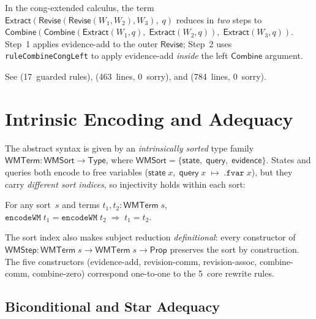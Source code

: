 \documentclass[11pt,openany]{report}
\begin{document}
\begin{theorem}
In the cong-extended calculus, the term
$\mathsf{Extract}(\mathsf{Revise}(\mathsf{Revise}(W_1, W_2), W_3),\; q)$
reduces in \emph{two} steps to
$\mathsf{Combine}(\mathsf{Combine}(\mathsf{Extract}(W_1,q),\;
\mathsf{Extract}(W_2,q)),\; \mathsf{Extract}(W_3,q))$.
Step~1 applies evidence-add to the outer $\mathsf{Revise}$;
Step~2 uses \texttt{ruleCombineCongLeft} to apply evidence-add
\emph{inside} the left $\mathsf{Combine}$ argument.
\end{theorem}

\noindent
See 
(17~guarded rules),
(463~lines, 0~sorry), and
(784~lines, 0~sorry).

\section{Intrinsic Encoding and Adequacy}
\label{sec:wm-encoding}

The abstract syntax is given by an \emph{intrinsically sorted} type family
$\mathsf{WMTerm} : \mathsf{WMSort} \to \mathsf{Type}$, where
$\mathsf{WMSort} = \{\mathsf{state},\; \mathsf{query},\;
\mathsf{evidence}\}$.
States and queries both encode to free variables
($\mathsf{state}\;x,\;\mathsf{query}\;x \;\mapsto\; \mathtt{.fvar}\;x$),
but they carry \emph{different sort indices}, so injectivity holds
within each sort:

\begin{theorem}
\label{thm:encode-injective}
For any sort~$s$ and terms $t_1, t_2 : \mathsf{WMTerm}\;s$,\;
$\mathtt{encodeWM}\;t_1 = \mathtt{encodeWM}\;t_2
\;\Rightarrow\; t_1 = t_2$.
\end{theorem}

\noindent
The sort index also makes subject reduction \emph{definitional}: every
constructor of $\mathsf{WMStep} : \mathsf{WMTerm}\;s \to
\mathsf{WMTerm}\;s \to \mathsf{Prop}$ preserves the sort by
construction.  The five constructors (evidence-add, revision-comm,
revision-assoc, combine-comm, combine-zero) correspond one-to-one to
the 5~core rewrite rules.

\subsection{Biconditional and Star Adequacy}
\label{sec:wm-star-adequacy}
\end{document}
